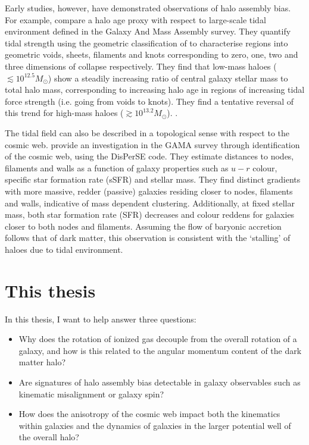 Early studies, however, have demonstrated observations of halo assembly bias. For example, \citet{tojeiro2017} compare a halo age proxy with respect to large-scale tidal environment defined in the Galaxy And Mass Assembly \citep[GAMA;][]{driver2009, driver2011} survey. They quantify tidal strength using the geometric classification of \citet{eardley2015} to characterise regions into geometric voids, sheets, filaments and knots corresponding to zero, one, two and three dimensions of collapse respectively. They find that low-mass haloes ($\lesssim 10^{12.5} M_{\odot}$) show a steadily increasing ratio of central galaxy stellar mass to total halo mass, corresponding to increasing halo age in regions of increasing tidal force strength (i.e. going from voids to knots). They find a tentative reversal of this trend for high-mass haloes ($\gtrsim 10^{13.2} M_{\odot}$). \citep[See][who explicitly look for changes in halo to stellar mass ratio with geometric environment using stacked lensing profiles, but find no significant changes when averaging over halo mass.]{brouwer2016}.

The tidal field can also be described in a topological sense with respect to the cosmic web. \citet{kraljic2018} provide an investigation in the GAMA survey through identification of the cosmic web, using the DisPerSE code. They estimate distances to nodes, filaments and walls as a function of galaxy properties such as $u - r$ colour, specific star formation rate (sSFR) and stellar mass. They find distinct gradients with more massive, redder (passive) galaxies residing closer to nodes, filaments and walls, indicative of mass dependent clustering. Additionally, at fixed stellar mass, both star formation rate (SFR) decreases and colour reddens for galaxies closer to both nodes and filaments. Assuming the flow of baryonic accretion follows that of dark matter, this observation is consistent with the `stalling' of haloes due to tidal environment.

\section{This thesis}
In this thesis, I want to help answer three questions:

\begin{itemize}
    
    \item Why does the rotation of ionized gas decouple from the overall rotation of a galaxy, and how is this related to the angular momentum content of the dark matter halo?
    
    \item Are signatures of halo assembly bias detectable in galaxy observables such as kinematic misalignment or galaxy spin? 
    
    \item How does the anisotropy of the cosmic web impact both the kinematics within galaxies and the dynamics of galaxies in the larger potential well of the overall halo?
    
\end{itemize}

